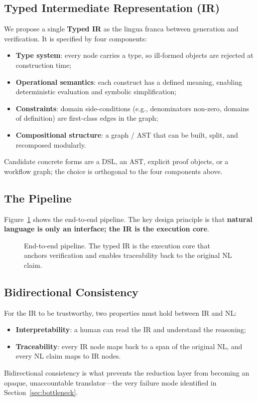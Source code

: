 \documentclass[11pt]{article}
\begin{document}
\subsection{Typed Intermediate Representation (IR)}
\label{sec:ir}
We propose a single \textbf{Typed IR} as the lingua franca between generation and
verification. It is specified by four components:
\begin{itemize}
    \item \textbf{Type system}: every node carries a type, so ill-formed objects are
          rejected at construction time;
    \item \textbf{Operational semantics}: each construct has a defined meaning, enabling
          deterministic evaluation and symbolic simplification;
    \item \textbf{Constraints}: domain side-conditions (e.g., denominators non-zero,
          domains of definition) are first-class edges in the graph;
    \item \textbf{Compositional structure}: a graph / AST that can be built, split, and
          recomposed modularly.
\end{itemize}
Candidate concrete forms are a DSL, an AST, explicit proof objects, or a workflow
graph; the choice is orthogonal to the four components above.

\subsection{The Pipeline}
\label{sec:pipeline}
Figure~\ref{fig:pipeline} shows the end-to-end pipeline. The key design principle is
that \textbf{natural language is only an interface; the IR is the execution core}.

\begin{figure}[t]
\centering
{}
\;\;
\;\;
\;\;
\caption{End-to-end pipeline. The typed IR is the execution core that anchors
verification and enables traceability back to the original NL claim.}
\label{fig:pipeline}
\end{figure}

\subsection{Bidirectional Consistency}
\label{sec:bidir}
For the IR to be trustworthy, two properties must hold between IR and NL:
\begin{itemize}
    \item \textbf{Interpretability}: a human can read the IR and understand the reasoning;
    \item \textbf{Traceability}: every IR node maps back to a span of the original NL,
          and every NL claim maps to IR nodes.
\end{itemize}
Bidirectional consistency is what prevents the reduction layer from becoming an
opaque, unaccountable translator---the very failure mode identified in
Section~\ref{sec:bottleneck}.
\end{document}
